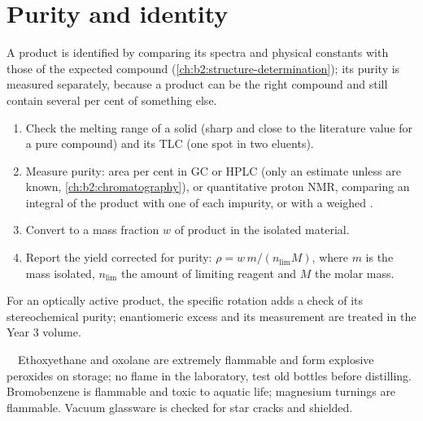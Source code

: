 \section{Purity and identity}

A product is identified by comparing its spectra and physical constants with those of the expected
compound (\cref{ch:b2:structure-determination}); its purity is measured separately, because a product
can be the right compound and still contain several per cent of something else.

\begin{method}\label{met:b2:lab-techniques-2:purity}
\begin{enumerate}
  \item Check the melting range of a solid (sharp and close to the literature value for a pure
        compound) and its TLC (one spot in two eluents).
  \item Measure purity: area per cent in GC or HPLC (only an estimate unless  are known,
        \cref{ch:b2:chromatography}), or quantitative proton NMR, comparing an integral of the product
        with one of each impurity, or with a weighed .
  \item Convert to a mass fraction $w$ of product in the isolated material.
  \item Report the yield corrected for purity: $\rho = w\,m/(n_{\mathrm{lim}}M)$, where $m$ is the
        mass isolated, $n_{\mathrm{lim}}$ the amount of limiting reagent and $M$ the molar mass.
\end{enumerate}
\end{method}

For an optically active product, the specific rotation adds a check of its stereochemical purity;
enantiomeric excess and its measurement are treated in the Year 3 volume.

\begin{safety}{\,\,\,\,}
Ethoxyethane and oxolane are extremely flammable and form explosive peroxides on storage; no flame in
the laboratory, test old bottles before distilling. Bromobenzene is flammable and toxic to aquatic
life; magnesium turnings are flammable. Vacuum glassware is checked for star cracks and shielded.
\end{safety}

